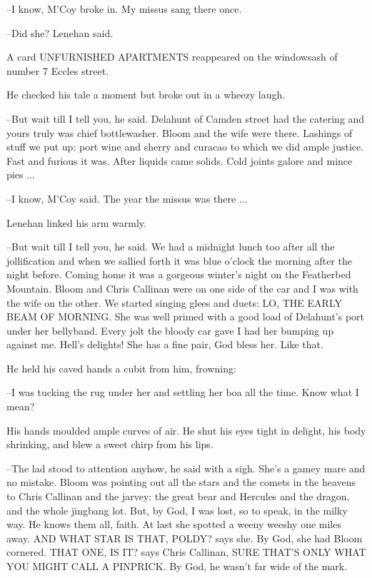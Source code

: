 --I know, M'Coy broke in. My missus sang there once.

--Did she? Lenehan said.

A card UNFURNISHED APARTMENTS reappeared on the windowsash of
number 7 Eccles street.

He checked his tale a moment but broke out in a wheezy laugh.

--But wait till I tell you, he said. Delahunt of Camden street had the
catering and yours truly was chief bottlewasher. Bloom and the wife were
there. Lashings of stuff we put up: port wine and sherry and curacao to
which we did ample justice. Fast and furious it was. After liquids came
solids. Cold joints galore and mince pies ...

--I know, M'Coy said. The year the missus was there ...

Lenehan linked his arm warmly.

--But wait till I tell you, he said. We had a midnight lunch too after all
the jollification and when we sallied forth it was blue o'clock the
morning after the night before. Coming home it was a gorgeous winter's
night on the Featherbed Mountain. Bloom and Chris Callinan were on one
side of the car and I was with the wife on the other. We started singing
glees and duets: LO, THE EARLY BEAM OF MORNING. She was well primed with a
good load of Delahunt's port under her bellyband. Every jolt the bloody
car gave I had her bumping up against me. Hell's delights! She has a fine
pair, God bless her. Like that.


He held his caved hands a cubit from him, frowning:

--I was tucking the rug under her and settling her boa all the time. Know
what I mean?

His hands moulded ample curves of air. He shut his eyes tight in
delight, his body shrinking, and blew a sweet chirp from his lips.

--The lad stood to attention anyhow, he said with a sigh. She's a gamey
mare and no mistake. Bloom was pointing out all the stars and the comets
in the heavens to Chris Callinan and the jarvey: the great bear and
Hercules and the dragon, and the whole jingbang lot. But, by God, I was
lost, so to speak, in the milky way. He knows them all, faith. At last she
spotted a weeny weeshy one miles away. AND WHAT STAR IS THAT, POLDY? says
she. By God, she had Bloom cornered. THAT ONE, IS IT? says Chris Callinan,
SURE THAT'S ONLY WHAT YOU MIGHT CALL A PINPRICK. By God, he wasn't far
wide of the mark.

